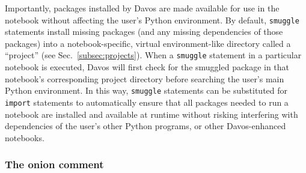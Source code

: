 \documentclass[preprint,12pt,a4paper]{elsarticle}
\begin{document}
Importantly, packages installed by Davos are made available for use in the
notebook without affecting the user's Python environment. By default,
\texttt{smuggle} statements install missing packages (and any missing
dependencies of those packages) into a notebook-specific, virtual
environment-like directory called a ``project'' (see
Sec.~\ref{subsec:projects}). When a \texttt{smuggle} statement in a particular
notebook is executed, Davos will first check for the smuggled package in that
notebook's corresponding project directory before searching the user's main
Python environment. In this way, \texttt{smuggle} statements can be substituted
for \texttt{import} statements to automatically ensure that all packages needed
to run a notebook are installed and available at runtime without risking
interfering with dependencies of the user's other Python programs, or other
Davos-enhanced notebooks.


\subsubsection{The onion comment}\label{subsec:onion}
\end{document}

